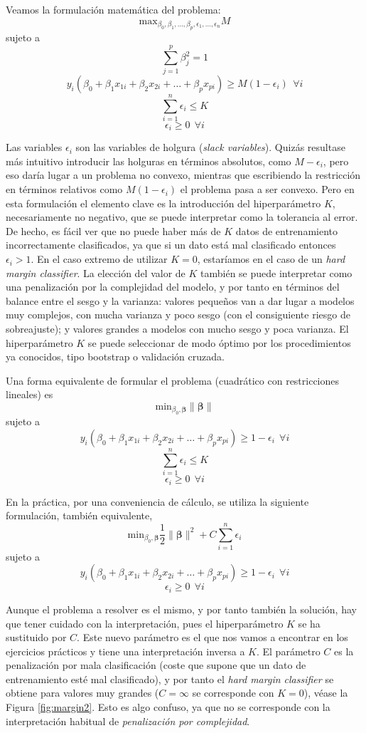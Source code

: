 \documentclass[
]{book}
\theoremstyle{break}
\theoremstyle{nonumberplain}
\begin{document}
Veamos la formulación matemática del problema:
\[\mbox{max}_{\beta_0, \beta_1,\ldots, \beta_p, \epsilon_1,\ldots, \epsilon_n} M\]
sujeto a
\[\sum_{j=1}^p \beta_j^2 = 1\]
\[ y_i(\beta_0 + \beta_1 x_{1i} + \beta_2 x_{2i} + \ldots + \beta_p x_{pi}) \ge M(1 - \epsilon_i) \ \ \forall i\]
\[\sum_{i=1}^n \epsilon_i \le K\]
\[\epsilon_i \ge 0 \ \ \forall i\]

Las variables \(\epsilon_i\) son las variables de holgura (\emph{slack variables}).
Quizás resultase más intuitivo introducir las holguras en términos absolutos, como \(M -\epsilon_i\), pero eso daría lugar a un problema no convexo, mientras que escribiendo la restricción en términos relativos como \(M(1 - \epsilon_i)\) el problema pasa a ser convexo.
Pero en esta formulación el elemento clave es la introducción del hiperparámetro \(K\), necesariamente no negativo, que se puede interpretar como la tolerancia al error.
De hecho, es fácil ver que no puede haber más de \(K\) datos de entrenamiento incorrectamente clasificados, ya que si un dato está mal clasificado entonces \(\epsilon_i > 1\).
En el caso extremo de utilizar \(K = 0\), estaríamos en el caso de un \emph{hard margin classifier}.
La elección del valor de \(K\) también se puede interpretar como una penalización por la complejidad del modelo, y por tanto en términos del balance entre el sesgo y la varianza: valores pequeños van a dar lugar a modelos muy complejos, con mucha varianza y poco sesgo (con el consiguiente riesgo de sobreajuste); y valores grandes a modelos con mucho sesgo y poca varianza.
El hiperparámetro \(K\) se puede seleccionar de modo óptimo por los procedimientos ya conocidos, tipo bootstrap o validación cruzada.

Una forma equivalente de formular el problema (cuadrático con restricciones lineales) es
\[\mbox{min}_{\beta_0, \boldsymbol{\beta}} \lVert \boldsymbol{\beta} \rVert\]
sujeto a
\[ y_i(\beta_0 + \beta_1 x_{1i} + \beta_2 x_{2i} + \ldots + \beta_p x_{pi}) \ge 1 - \epsilon_i \ \ \forall i\]
\[\sum_{i=1}^n \epsilon_i \le K\]
\[\epsilon_i \ge 0 \ \ \forall i\]

En la práctica, por una conveniencia de cálculo, se utiliza la siguiente formulación, también equivalente,
\[\mbox{min}_{\beta_0, \boldsymbol{\beta}} \frac{1}{2}\lVert \boldsymbol{\beta} \rVert^2 + C \sum_{i=1}^n \epsilon_i\]
sujeto a
\[ y_i(\beta_0 + \beta_1 x_{1i} + \beta_2 x_{2i} + \ldots + \beta_p x_{pi}) \ge 1 - \epsilon_i \ \ \forall i\]
\[\epsilon_i \ge 0 \ \ \forall i\]

Aunque el problema a resolver es el mismo, y por tanto también la solución, hay que tener cuidado con la interpretación, pues el hiperparámetro \(K\) se ha sustituido por \(C\). Este nuevo parámetro es el que nos vamos a encontrar en los ejercicios prácticos y tiene una interpretación inversa a \(K\). El parámetro \(C\) es la penalización por mala clasificación (coste que supone que un dato de entrenamiento esté mal clasificado), y por tanto el \emph{hard margin classifier} se obtiene para valores muy grandes (\(C = \infty\) se corresponde con \(K = 0\)), véase la Figura \ref{fig:margin2}. Esto es algo confuso, ya que no se corresponde con la interpretación habitual de \emph{penalización por complejidad}.
\end{document}
